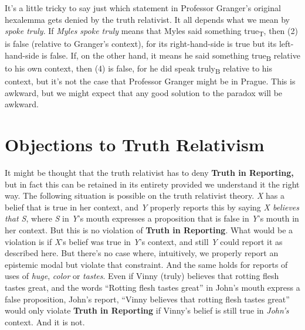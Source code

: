 \documentclass[
  11pt,
  letterpaper,
  DIV=11,
  numbers=noendperiod,
  twoside]{scrartcl}
\begin{document}
It's a little tricky to say just which statement in Professor Granger's
original hexalemma gets denied by the truth relativist. It all depends
what we mean by \emph{spoke truly}. If \emph{Myles spoke truly} means
that Myles said something true\textsubscript{T}, then (2) is false
(relative to Granger's context), for its right-hand-side is true but its
left-hand-side is false. If, on the other hand, it means he said
something true\textsubscript{B} relative to his own context, then (4) is
false, for he did speak truly\textsubscript{B} relative to his context,
but it's not the case that Professor Granger might be in Prague. This is
awkward, but we might expect that any good solution to the paradox will
be awkward.

\section{Objections to Truth
Relativism}\label{objections-to-truth-relativism}

It might be thought that the truth relativist has to deny \textbf{Truth
in Reporting,} but in fact this can be retained in its entirety provided
we understand it the right way. The following situation is possible on
the truth relativist theory. \emph{X} has a belief that is true in her
context, and \emph{Y} properly reports this by saying \emph{X believes
that S}, where \emph{S} in \emph{Y}'s mouth expresses a proposition that
is false in \emph{Y}'s mouth in her context. But this is no violation of
\textbf{Truth in Reporting}. What would be a violation is if \emph{X}'s
belief was true in \emph{Y}'s context, and still \emph{Y} could report
it as described here. But there's no case where, intuitively, we
properly report an epistemic modal but violate that constraint. And the
same holds for reports of uses of \emph{huge}, \emph{color} or
\emph{tastes}. Even if Vinny (truly) believes that rotting flesh tastes
great, and the words ``Rotting flesh tastes great'' in John's mouth
express a false proposition, John's report, ``Vinny believes that
rotting flesh tastes great'' would only violate \textbf{Truth in
Reporting} if Vinny's belief is still true in \emph{John's} context. And
it is not.
\end{document}
